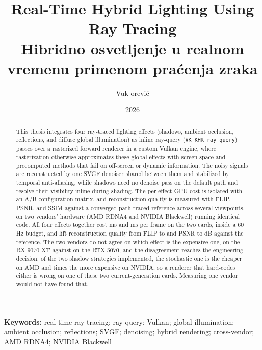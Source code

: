 \documentclass[master,a4paper,12pt,oneside]{etf}
\title{Real-Time Hybrid Lighting Using Ray Tracing\\[0.6ex]
       {\large Hibridno osvetljenje u realnom vremenu primenom pra\'cenja zraka}}
\author{Vuk \DJ or\dj evi\'c}
\date{2026}
\newenvironment{keywordsen}
  {\vspace{5ex}\parindent 0pt {\bfseries Keywords:}}
  {\par\vfil\null\endtitlepage}
\begin{document}
\maketitle

\begin{abstract}
This thesis integrates four ray-traced lighting effects (shadows, ambient occlusion, reflections,
and diffuse global illumination) as inline ray-query (\texttt{VK_KHR_ray_query}) passes over a
rasterized forward renderer in a custom Vulkan engine, where rasterization otherwise approximates
these global effects with screen-space and precomputed methods that fail on off-screen or dynamic
information. The noisy signals are reconstructed by one SVGF denoiser shared between them and
stabilized by temporal anti-aliasing, while shadows need no denoise pass on the default path and
resolve their visibility inline during shading. The per-effect GPU cost is isolated with an A/B configuration matrix, and
reconstruction quality is measured with FLIP, PSNR, and SSIM against a converged path-traced
reference across several viewpoints, on two vendors' hardware (AMD RDNA4 and NVIDIA Blackwell)
running identical code. All four effects together cost \perfTotalAMD{} ms and \perfTotalNV{} ms per
frame on the two cards, inside a 60 Hz budget, and lift reconstruction quality from FLIP
\qRasterFlip{} to \qAllRtFlip{} and PSNR \qRasterPsnr{} to \qAllRtPsnr{} dB against the reference.
The two vendors do not agree on which effect is the expensive one, \perfTopEffectAMD{} on the
RX 9070 XT against \perfTopEffectNV{} on the RTX 5070, and the disagreement reaches the engineering
decision: of the two shadow strategies implemented, the stochastic one is the cheaper on AMD and
\perfShadowRatioNV{} times the more expensive on NVIDIA, so a renderer that hard-codes either is
wrong on one of these two current-generation cards. Measuring one vendor would not have found that.
\end{abstract}

\begin{keywordsen}
real-time ray tracing; ray query; Vulkan; global illumination; ambient occlusion; reflections; SVGF;
denoising; hybrid rendering; cross-vendor; AMD RDNA4; NVIDIA Blackwell
\end{keywordsen}
\end{document}
